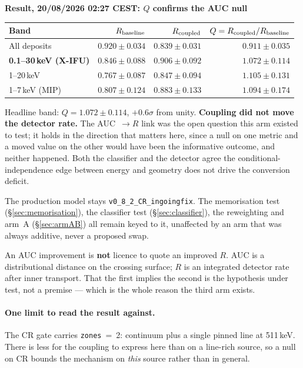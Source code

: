 \documentclass[11pt,a4paper]{article}
\newenvironment{callout}[3]%
{\par\medskip\noindent
 \def\calloutframe{#1}\def\calloutback{#2}%
 \setlength{\fboxrule}{0.9pt}\setlength{\fboxsep}{8pt}%
 \begin{lrbox}{\calloutbox}%
 \begin{minipage}{\dimexpr\textwidth-2\fboxsep-2\fboxrule\relax}%
 \setlength{\parskip}{4pt}%
 \textcolor{#1}{\textbf{#3}}\par\nobreak\smallskip}
{\end{minipage}\end{lrbox}%
 \fcolorbox{\calloutframe}{\calloutback}{\usebox{\calloutbox}}%
 \par\medskip}
\begin{document}
\begin{callout}{ok}{green!4}{Result, 20/08/2026 02:27 CEST: $Q$ confirms the AUC null}
\begin{center}
\begin{tabular}{lrrr}
\toprule
Band & $R_{\rm baseline}$ & $R_{\rm coupled}$ & $Q = R_{\rm coupled}/R_{\rm baseline}$ \\
\midrule
All deposits             & $0.920 \pm 0.034$ & $0.839 \pm 0.031$ & $0.911 \pm 0.035$ \\
\textbf{0.1--30\,keV (X-IFU)} & $0.846 \pm 0.088$ & $0.906 \pm 0.092$ & $\mathbf{1.072 \pm 0.114}$ \\
1--20\,keV               & $0.767 \pm 0.087$ & $0.847 \pm 0.094$ & $1.105 \pm 0.131$ \\
1--7\,keV (MIP)          & $0.807 \pm 0.124$ & $0.883 \pm 0.133$ & $1.094 \pm 0.174$ \\
\bottomrule
\end{tabular}
\end{center}
Headline band: $Q = 1.072 \pm 0.114$, $+0.6\sigma$ from unity. \textbf{Coupling did
not move the detector rate.} The AUC~$\to R$ link was the open question this arm
existed to test; it holds in the direction that matters here, since a null on one
metric and a moved value on the other would have been the informative outcome, and
neither happened. Both the classifier and the detector agree the
conditional-independence edge between energy and geometry does not drive the
conversion deficit.

The production model stays \texttt{v0\_8\_2\_CR\_ingoingfix}. The memorisation test
(\S\ref{sec:memorisation}), the classifier test (\S\ref{sec:classifier}), the
reweighting and arm~A (\S\ref{sec:armAB}) all remain keyed to it, unaffected by an
arm that was always additive, never a proposed swap.
\end{callout}

An AUC improvement is \textbf{not} licence to quote an improved $R$. AUC is a
distributional distance on the crossing surface; $R$ is an integrated detector
rate after inner transport. That the first implies the second is the hypothesis
under test, not a premise --- which is the whole reason the third arm exists.

\paragraph{One limit to read the result against.} The CR gate carries
\texttt{zones}~=~2: continuum plus a single pinned line at 511\,keV. There is
less for the coupling to express here than on a line-rich source, so a null on CR
bounds the mechanism on \emph{this} source rather than in general.
\end{document}
